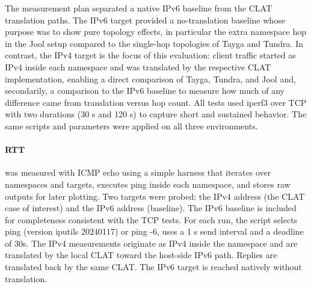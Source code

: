 The measurement plan separated a native IPv6 baseline from the CLAT translation paths. The IPv6 target provided a no-translation baseline whose purpose was to show pure topology effects, in particular the extra namespace hop in the Jool setup compared to the single-hop topologies of Tayga and Tundra. In contrast, the IPv4 target is the focus of this evaluation: client traffic started as IPv4 inside each namespace and was translated by the respective CLAT implementation, enabling a direct comparison of Tayga, Tundra, and Jool and, secondarily, a comparison to the IPv6 baseline to measure how much of any difference came from translation versus hop count. All tests used iperf3 over TCP with two durations (30 s and 120 s) to capture short and sustained behavior. The same scripts and parameters were applied on all three environments. 

\paragraph{RTT} was measured with ICMP echo using a simple harness that iterates over namespaces and targets, executes ping inside each namespace, and stores raw outputs for later plotting. Two targets were probed: the IPv4 address (the CLAT case of interest) and the IPv6 address (baseline). The IPv6 baseline is included for completeness consistent with the TCP tests.
For each run, the script selects ping (version iputils 20240117) or ping -6, uses a 1 s send interval and a deadline of 30s. The IPv4 measurements originate as IPv4 inside the namespace and are translated by the local CLAT toward the host-side IPv6 path. Replies are translated back by the same CLAT. The IPv6 target is reached natively without translation. 
